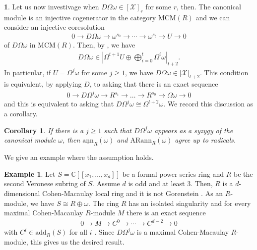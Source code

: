 \documentclass[12pt]{amsart}
\newcommand{\sann}{\underline{\mathrm{ann}}}
\newcommand{\arann}{\mathrm{ARann}}
\newcommand{\MCM}{\mathrm{MCM}}
\newcommand{\add}{\mathrm{add}}
\newcommand{\CC}{\mathcal{C}}
\newcommand{\XX}{\mathcal{X}}
\newtheorem{corollary}[theorem]{Corollary}
\theoremstyle{definition}
\newtheorem{example}[theorem]{Example}
\newtheorem{chunk}[theorem]{}
\numberwithin{equation}{theorem}
\def\CC{\mathbb{C}}
\begin{document}
\begin{chunk}
        Let us now investivage when $D\Omega \omega \in [\XX]_r $ for some $r$, then. The canonical module is an injective cogenerator in the category $\MCM(R)$ and we can consider an injective coresolution
        \begin{align*}
            0 \to D\Omega\omega \to \omega^{s_0} \to \cdots \to \omega^{s_t} \to U \to 0 
        \end{align*}
        of $D\Omega \omega$ in $\MCM(R)$. Then, by \cite[Lemma 5.8]{Dao-Takahashi}, we have
        \begin{align*}
            D\Omega \omega \in \left| \Omega^{t+1} U \oplus \bigoplus_{i=0}^{t} \Omega^i \omega \right|_{t+2}.
        \end{align*}
        In particular, if $U = \Omega^j \omega$ for some $j \geq 1$, we have $D\Omega \omega \in |\XX|_{t+2}$. This condition is equivalent, by applying $D$, to asking that there is an exact sequence
        \begin{align*}
            0 \to D\Omega^j \omega \to R^{s_t} \to \ldots \to R^{s_0} \to \Omega \omega \to 0
        \end{align*}
        and this is equivalent to asking that $D\Omega^j \omega \cong \Omega^{t+2}\omega$. We record this discussion as a corollary.
        \begin{corollary}
            If there is a $j \geq 1$ such that $D\Omega^j \omega$ appears as a syzygy of the canonical module $\omega$, then $\sann_R(\omega)$ and $\arann_R(\omega)$ agree up to radicals.
        \end{corollary}
        We give an example where the assumption holds.
        \begin{example}\label{Takahashi-example}
            Let $S = \CC[[x_1,\ldots, x_d]]$ be a formal power series ring and $R$ be the second Veronese subring of $S$. Assume $d$ is odd and at least $3$. Then, $R$ is a $d$-dimensional Cohen-Macaulay local ring and it is not Gorenstein \cite[Exercise 3.6.21]{Bruns-Herzog}. As an $R$-module, we have $S \cong R \oplus \omega$. The ring $R$ has an isolated singularity and for every maximal Cohen-Macaulay $R$-module $M$ there is an exact sequence 
            \begin{align*}
                0 \to M \to C^0 \to \cdots \to C^{d-2} \to 0
            \end{align*}
            with $C^i\in\add_R(S)$ for all $i$ \cite[2.2.3]{Iyama}. Since $D \Omega^j \omega$ is a maximal Cohen-Macaulay $R$-module, this gives us the desired result.
        \end{example}
\end{chunk}
\end{document}
